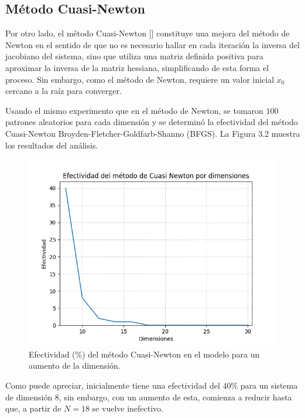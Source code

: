 \subsection{M\'etodo Cuasi-Newton}

\par Por otro lado, el m\'etodo Cuasi-Newton [\cite{23}] constituye una mejora del m\'etodo de Newton en el sentido de que no es necesario hallar en cada iteraci\'on la inversa del jacobiano del sistema, sino que utiliza una matriz definida positiva para aproximar la inversa de la matriz hessiana, simplificando de esta forma el proceso. Sin embargo, como el m\'etodo de Newton, requiere un valor inicial $x_0$ cercano a la ra\'iz para converger.

\par Usando el mismo experimento que en el m\'etodo de Newton, se tomaron $100$ patrones aleatorios para cada dimensi\'on y se determin\'o la efectividad del m\'etodo Cuasi-Newton Broyden-Fletcher-Goldfarb-Shanno (BFGS). La Figura 3.2 muestra los resultados del an\'alisis.\\

\begin{figure}[h]
\center
\includegraphics[scale=.4]{Graphics/CuasiNewton.png}
\caption{Efectividad (\%) del m\'etodo Cuasi-Newton en el modelo para un aumento de la dimensi\'on.}
\end{figure}

\par Como puede apreciar, inicialmente tiene una efectividad del $40\%$ para un sistema de dimensi\'on $8$, sin embargo, con un aumento de esta, comienza a reducir hasta que, a partir de $N=18$ se vuelve inefectivo.

